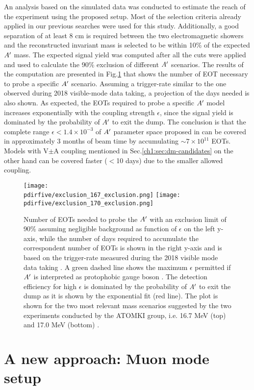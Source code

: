An analysis based on the simulated data was conducted to estimate the reach of the experiment using the proposed setup. Most of the selection criteria already applied in our previous searches were used for this study. Additionally, a good separation of at least 8 cm is required between the two electromagnetic showers and the reconstructed invariant mass is selected to be within 10\% of the expected $A'$ mass. The expected signal yield was computed after all the cuts were applied and used to calculate the 90\% exclusion of different $A'$ scenarios. The results of the computation are presented in Fig.\ref{fig:exclusion-x17} that shows the number of EOT necessary to probe a specific $A'$ scenario. Assuming a trigger-rate similar to the one observed during 2018 visible-mode data taking, a projection of the days needed is also shown. As expected, the EOTs required to probe a specific $A'$ model increases exponentially with the coupling strength $\epsilon$, since the signal yield is dominated by the probability of $A'$ to exit the dump. The conclusion is that the complete range $\epsilon < 1.4 \times 10^{-3}$ of $A'$ parameter space proposed in \cite{PhysRevD.95.035017} can be covered in approximately 3 months of beam time by accumulating $\sim 7 \times 10^{11}$ EOTs. Models with V$\pm$A coupling mentioned in Sec.\ref{ch1:sec:dm-candidates} on the other hand can be covered faster ($<$10 days) due to the smaller allowed coupling. 

\begin{figure}[htb!]
  \centering
  \texttt{[image: \\pdirfive/exclusion\_167\_exclusion.png]}
  \texttt{[image: \\pdirfive/exclusion\_170\_exclusion.png]}
  \caption[EOT to X17 exclusion]{Number of EOTs needed to probe the $A'$ with an exclusion limit of 90\% assuming negligible background as function of $\epsilon$ on the left y-axis, while the number of days required to accumulate the correspondent number of EOTs is shown in the right y-axis and is based on the trigger-rate measured during the 2018 visible mode data taking \cite{Banerjee:2019hmi}. A green dashed line shows the maximum $\epsilon$ permitted if $A'$ is interpreted as protophobic gauge boson \cite{PhysRevD.95.035017}. The detection efficiency for high $\epsilon$ is dominated by the probability of $A'$ to exit the dump as it is shown by the exponential fit (red line). The plot is shown for the two most relevant mass scenarios suggested by the two experiments conducted by the ATOMKI group, i.e. 16.7 MeV (top) and 17.0 MeV (bottom) \cite{Krasznahorkay:2015iga,Krasznahorkay:2019lyl}.}
  \label{fig:exclusion-x17}
\end{figure}
  
\section{A new approach: Muon mode setup}
\label{ch5:sec:muon-mode-setup}

